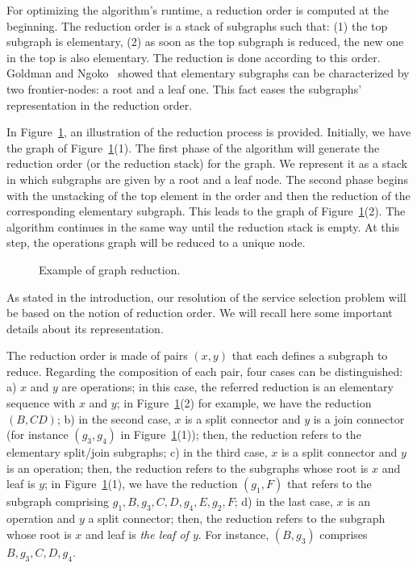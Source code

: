 \documentclass[a4paper]{article}
\begin{document}
For optimizing the algorithm's runtime, a reduction order is computed at the beginning. The reduction order is a stack of 
subgraphs such that: (1) the top subgraph is elementary, (2) as soon as the top subgraph is reduced, 
the new one in the  top is also elementary. The reduction is done 
according to this order. Goldman and Ngoko~\cite{GoldmanNgoko} showed that elementary subgraphs 
can be characterized by two frontier-nodes: a root and a leaf one. This fact eases the 
subgraphs' representation  in the reduction order. 

In Figure~\ref{Reduction-w-order}, an illustration of the reduction process is provided. 
Initially, we have the graph of Figure~\ref{Reduction-w-order}(1). The first phase of the 
algorithm will generate the reduction order (or the reduction stack) for the graph. We 
represent it as a stack in which subgraphs are given by a root and a leaf node. The second phase begins with 
the unstacking of the top element in the order and then the 
reduction of the corresponding elementary subgraph. This leads to the graph of 
Figure~\ref{Reduction-w-order}(2). The algorithm continues in the same way until 
the reduction stack is empty. At this step, the operations graph will be reduced to a unique node. 
\begin{figure}[htbp]
\centering
{}
\caption{Example of graph reduction.}\label{Reduction-w-order}
\end{figure}


As stated in the 
introduction, our resolution of the service selection problem will be based on the notion of reduction order.
We will recall here some important details about its representation. 

The reduction order is made of pairs $(x,y)$ that each defines a subgraph to reduce. Regarding the composition of 
each pair, four cases can be distinguished: a) $x$ and $y$ are operations;  
in this case, the referred reduction is an elementary sequence with $x$ and $y$; in Figure~\ref{Reduction-w-order}(2) 
for example, we have the reduction $(B, CD)$; b) in the second case, $x$ 
is a split connector and $y$ is a join connector (for instance  $(g_3, g_4)$ in Figure~\ref{Reduction-w-order}(1));  
then, the reduction refers to the elementary split/join subgraphs; c) in the third case, $x$ is a split connector 
and $y$ is an operation; then, the reduction 
refers to the subgraphs whose root is $x$ and leaf is $y$; in Figure~\ref{Reduction-w-order}(1), we have the reduction $(g_1, F)$ that
refers to the subgraph comprising $g_1, B, g_3, C, D, g_4, E, g_2, F$; d) in the last case, $x$ is an operation and 
$y$ a split connector; then, the reduction refers to the subgraph whose root is $x$ and leaf is {\it the leaf of $y$}. 
For instance, $(B, g_3)$ comprises $B, g_3, C, D, g_4$.
\end{document}
